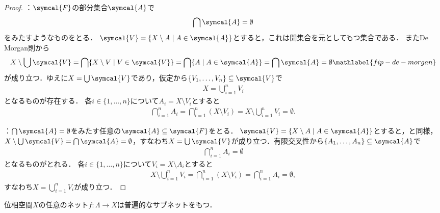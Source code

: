 \documentclass{ltjsbook}
\begin{document}
\begin{proof} ：\(\symcal{F}\)の部分集合\(\symcal{A}\)で
\begin{align*}
    \bigcap \symcal{A} = \emptyset
\end{align*}
をみたすようなものをとる．
\(\symcal{V} = \{ X \setminus A \mid A \in \symcal{A}\}\)とすると，これは開集合を元としてもつ集合である．
またDe Morgan則から
\begin{align}
    X \setminus \bigcup \symcal{V}
    = \bigcap \{X \setminus V \mid V \in \symcal{V}\}
    = \bigcap \{A \mid A \in \symcal{A}\}
    = \bigcap \symcal{A}
    = \emptyset \mathlabel{fip-de-morgan}
\end{align}
が成り立つ．ゆえに\(X = \bigcup \symcal{V}\)であり，仮定から\(\{V_1, \ldots, V_n\} \subseteq \symcal{V}\)で
\begin{align*}
    X = \bigcup_{i = 1}^n V_i
\end{align*}
となるものが存在する．
各\(i \in \{1, \ldots, n\}\)について\(A_i = X \setminus V_i\)とすると
\begin{align*}
    \bigcap_{i = 1}^n A_i
    = \bigcap_{i = 1}^n (X \setminus V_i)
    = X \setminus \bigcup_{i = 1}^n V_i
    = \emptyset.
\end{align*}

：\(\bigcap \symcal{A} = \emptyset\)をみたす任意の\(\symcal{A} \subseteq \symcal{F}\)をとる．
\(\symcal{V} = \{X \setminus A \mid A \in \symcal{A}\}\)とすると，と同様，\(X \setminus \bigcup \symcal{V} = \bigcap \symcal{A} = \emptyset\)，すなわち\(X = \bigcup \symcal{V}\)が成り立つ．有限交叉性から\(\{A_1, \ldots, A_n\} \subseteq \symcal{A}\)で
\begin{align*}
    \bigcap_{i = 1}^n A_i = \emptyset
\end{align*}
となるものがとれる．
各\(i \in \{1, \ldots, n\}\)について\(V_i = X \setminus A_i\)とすると
\begin{align*}
    X \setminus \bigcup_{i = 1}^n V_i
    = \bigcap_{i = 1}^n (X \setminus V_i)
    = \bigcap_{i = 1}^n A_i
    = \emptyset, %
\end{align*}
すなわち\(X = \bigcup_{i = 1}^n V_i\)が成り立つ．
\end{proof}

\begin{thmbox}
\begin{theorem}
位相空間\(X\)の任意のネット\(f \colon \Lambda \to X\)は普遍的なサブネットをもつ．
\end{theorem}
\end{thmbox}
\end{document}
